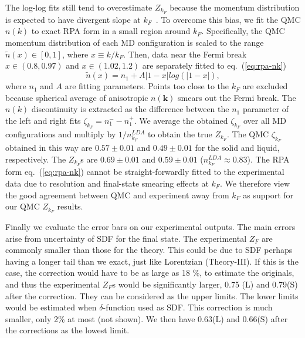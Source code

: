 \documentclass[twocolumn,showpacs,showkeys,fleqn,prl,superscriptaddress]{revtex4}%
\begin{document}
\vspace{10mm}

The log-log fits still tend to overestimate $Z_{k_F}$ because the momentum distribution is expected to have divergent slope at $k_F$~\cite{gg02}. To overcome this bias, we fit the QMC $n(k)$ to exact RPA form in a small region around $k_F$. Specifically, the QMC momentum distribution of each MD configuration is scaled to the range $\tilde{n}(x) \in [0, 1]$, where $x\equiv k/k_F$. Then, data near the Fermi break $x\in(0.8, 0.97)$ and $x\in(1.02, 1.2)$ are separately fitted to eq.~(\ref{eq:rpa-nk})
\begin{equation} \label{eq:rpa-nk}
\tilde{n}(x) = n_1 + A\vert 1-x\vert log\left(\vert 1-x\vert\right),
\end{equation}
where $n_1$ and $A$ are fitting parameters. Points too close to the $k_F$ are excluded because spherical average of anisotropic $n(\boldsymbol{k})$ smears out the Fermi break. The $n(k)$ discontinuity is extracted as the difference between the $n_1$ parameter of the left and right fits $\zeta_{k_F}= n_1^--n_1^+$. We average the obtained $\zeta_{k_F}$ over all MD configurations and multiply by $1/n_{k_F}^{LDA}$ to obtain the true $Z_{k_F}$. The QMC $\zeta_{k_F}$ obtained in this way are $0.57\pm0.01$ and $0.49\pm0.01$ for the solid and liquid, respectively. The $Z_{k_F}$s are $0.69\pm0.01$ and $0.59\pm0.01$ ($n_{k_F}^{LDA}\approx0.83$).
The RPA form eq.~(\ref{eq:rpa-nk}) cannot be straight-forwardly fitted to the experimental data due to resolution and final-state smearing effects at $k_F$. We therefore view the good agreement between QMC and experiment away from $k_F$ as support for our QMC $Z_{k_F}$ results.

\vspace{10mm}

Finally we evaluate the error bars on our experimental outputs.
The main errors arise from uncertainty of SDF for the final state.
The experimental $Z_F$ are commonly smaller than those for the theory.
This could be due to SDF perhaps having a longer tail than we exact, just like Lorentzian (Theory-III). 
If this is the case, the correction would have to be as large as 18 \%, to estimate the originals, and thus the experimental $Z_F$s would be significantly larger, 0.75 (L) and 0.79(S) after the correction. 
They can be considered as the upper limits.
The lower limits would be estimated when $\delta$-function used as SDF. This correction is much smaller, only 2\% at most (not shown).
We then have 0.63(L) and 0.66(S) after the corrections as the lowest limit.    
\end{document}
